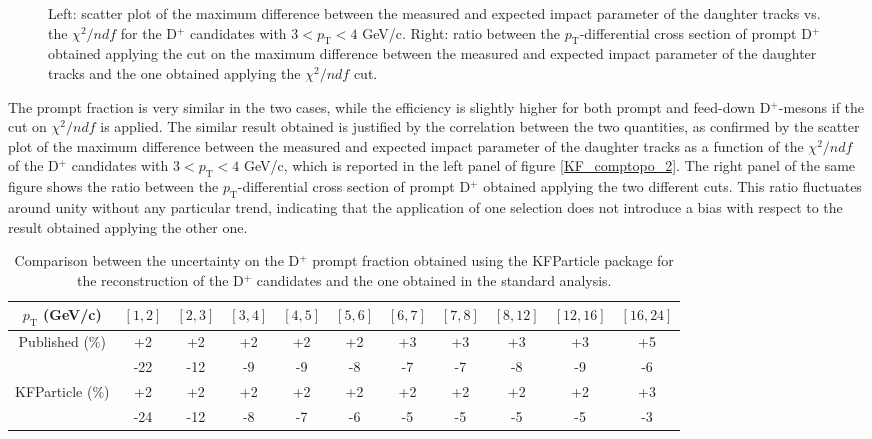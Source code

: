 \documentclass[b5paper,10pt,twoside,oldstyle,classica]{toptesi}
\newcommand{\pt}{p_\text{T}}
\begin{document}
\begin{figure}[tb]
\begin{center}
\caption{Left: scatter plot of the maximum difference between the measured and expected impact parameter of the daughter tracks vs. the $\chi^2/ndf$ for the D$^+$ candidates with $3<\pt<4$ GeV/c. Right: ratio between the $\pt$-differential cross section of prompt D$^+$ obtained applying the cut on the maximum difference between the measured and expected impact parameter of the daughter tracks and the one obtained applying the $\chi^{2}/ndf$ cut.}
\label{KF_comptopo_1}
\end{center}
\end{figure} The prompt fraction is very similar in the two cases, while the efficiency is slightly higher for both prompt and feed-down D$^+$-mesons if the cut on $\chi^2/ndf$ is applied. The similar result obtained is justified by the correlation between the two quantities, as confirmed by the scatter plot of the maximum difference between the measured and expected impact parameter of the daughter tracks as a function of the $\chi^2/ndf$ of the D$^+$ candidates with $3<\pt<4$ GeV/c, which is reported in the left panel of figure \ref{KF_comptopo_2}. The right panel of the same figure shows the ratio between the $\pt$-differential cross section of prompt D$^+$ obtained applying the two different cuts. 
This ratio fluctuates around unity without any particular trend, indicating that the application of one selection does not introduce a bias with respect to the result obtained applying the other one. 
\begin{table}[b]
\centering 
\begin{center} %
\renewcommand\arraystretch{1.4} 
\fontsize{7.5}{10}\selectfont
\begin{tabular}{|c|c|c|c|c|c|c|c|c|c|c|}
\hline
$\pt$ (GeV/c) & $[1,2]$ & $[2,3]$ & $[3,4]$ & $[4,5]$ & $[5,6]$ & $[6,7]$ & $[7,8]$ & $[8,12]$ & $[12,16]$ & $[16,24]$\\
\hline
\multirow{2}{*}{Published (\%)}& +2 & +2 & +2 & +2 & +2 & +3 & +3 & +3 & +3 & +5\\
& -22 & -12 & -9 & -9 & -8 & -7 & -7 & -8 & -9 & -6\\
\hline
\multirow{2}{*}{KFParticle (\%)}& +2 & +2 & +2 & +2 & +2 & +2 & +2 & +2 & +2 & +3\\
& -24 & -12 & -8 & -7 & -6 & -5 & -5 & -5 & -5 & -3\\
\hline
\end{tabular} 
\caption{Comparison between the uncertainty on the D$^+$ prompt fraction obtained using the KFParticle package for the reconstruction of the D$^+$ candidates and the one obtained in the standard analysis.}
\label{promptfrac_syst_comp}
\end{center} 
\end{table}
\end{document}
